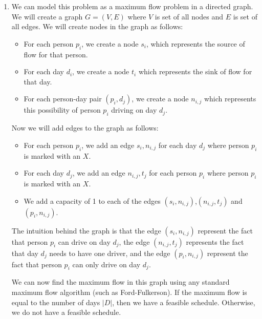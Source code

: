 \documentclass[addpoints,a4paper]{exam}
\begin{document}
\begin{questions}
	\begin{solution}
		\begin{enumerate}
			\item We can model this problem as a maximum flow problem in a directed graph. We will create a graph \(G=(V,E)\) where \(V\) is set of all nodes and \(E\) is set of all edges. We will create nodes in the graph as follows:
			      \begin{itemize}
				      \item For each person \(p_i\), we create a node \(s_i\), which represents the source of flow for that person.
				      \item For each day \(d_i\), we create a node \(t_i\) which represents the sink of flow for that day.
				      \item For each person-day pair \((p_i,d_j)\), we create a node \(n_{i,j}\) which represents this possibility of person \(p_i\) driving on day \(d_j\).
			      \end{itemize}
			      Now we will add edges to the graph as follows:
			      \begin{itemize}
				      \item For each person \(p_i\), we add an edge \(s_i, n_{i,j}\) for each day \(d_j\) where person \(p_i\) is marked with an \(X\).
				      \item For each day \(d_j\), we add an edge \(n_{i,j}, t_j\) for each person \(p_i\) where person \(p_i\) is marked with an \(X\).
				      \item We add a capacity of 1 to each of the edges \((s_i,n_{i,j})\),\((n_{i,j},t_j)\) and \((p_i,n_{i,j})\).
			      \end{itemize}
			      The intuition behind the graph is that the edge \((s_i,n_{i,j})\) represent the fact that person \(p_i\) can drive on day \(d_j\), the edge \((n_{i,j},t_j)\) represents the fact that day \(d_j\) needs to have one driver, and the edge \((p_i,n_{i,j})\) represent the fact that person \(p_i\) can only drive on day \(d_j\).
			      
			      We can now find the maximum flow in this graph using any standard maximum flow algorithm (such as Ford-Fulkerson). If the maximum flow is equal to the number of days \(|D|\), then we have a feasible schedule. Otherwise, we do not have a feasible schedule.
			      

\end{enumerate}
\end{solution}
\end{questions}
\end{document}
